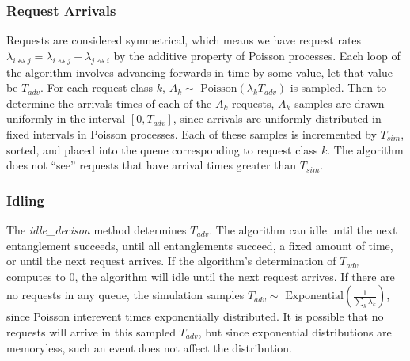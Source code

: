 \subsubsection{Request Arrivals}
Requests are considered symmetrical, which means we have request rates $\lambda_{i \leftrightsquigarrow j} = \lambda_{i \rightsquigarrow j} + \lambda_{j \rightsquigarrow i}$ by the additive property of Poisson processes.
Each loop of the algorithm involves advancing forwards in time by some value, let that value be $T_{adv}$.
For each request class $k$, $A_k \sim \text{ Poisson}(\lambda_kT_{adv})$ is sampled.
Then to determine the arrivals times of each of the $A_k$ requests, $A_k$ samples are drawn uniformly in the interval $[0, T_{adv}]$, since arrivals are uniformly distributed in fixed intervals in Poisson processes.
Each of these samples is incremented by $T_{sim}$, sorted, and placed into the queue corresponding to request class $k$.
The algorithm does not ``see'' requests that have arrival times greater than $T_{sim}$.
\subsubsection{Idling}
The \textit{idle\_decison} method determines $T_{adv}$. The algorithm can idle until the next entanglement succeeds, until all entanglements succeed, a fixed amount of time, or until the next request arrives.
If the algorithm's determination of $T_{adv}$ computes to 0, the algorithm will idle until the next request arrives.
If there are no requests in any queue, the simulation samples $T_{adv} \sim \text{ Exponential}\left(\frac{1}{\sum_k\lambda_k}\right)$, since Poisson interevent times exponentially distributed.
It is possible that no requests will arrive in this sampled $T_{adv}$, but since exponential distributions are memoryless, such an event does not affect the distribution.